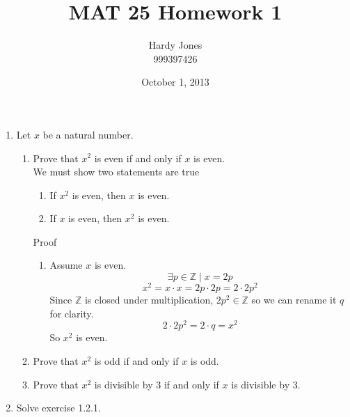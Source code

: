 \documentclass[12pt]{article}
\begin{document}
\title{MAT 25 Homework 1}
\author{Hardy Jones\\
        999397426}
\date{October 1, 2013}

\maketitle

\begin{enumerate}
    \item Let $x$ be a natural number.
    \begin{enumerate}
        \item Prove that $x^2$ is even if and only if $x$ is even. \\

            We must show two statements are true
            \begin{enumerate}
                \item If $x^2$ is even, then $x$ is even.
                \item If $x$ is even, then $x^2$ is even.
            \end{enumerate}

            Proof

            \begin{enumerate}
                \item
                    Assume $x$ is even.
                    \[\exists p \in \mathbb{Z} \mid x = 2p\]
                    \[x^2 = x \cdot x = 2p \cdot 2p = 2 \cdot 2p^2\]
                    Since $\mathbb{Z}$ is closed under multiplication,
                    $2p^2 \in \mathbb{Z}$ so we can rename it $q$ for clarity.
                    \[2 \cdot 2p^2 = 2 \cdot q = x^2\]
                    So $x^2$ is even.
            \end{enumerate}

        \item Prove that $x^2$ is odd if and only if $x$ is odd.

        \item Prove that $x^2$ is divisible by $3$ if and only if
              $x$ is divisible by $3$.
    \end{enumerate}

    \item Solve exercise 1.2.1.
\end{enumerate}
\end{document}
